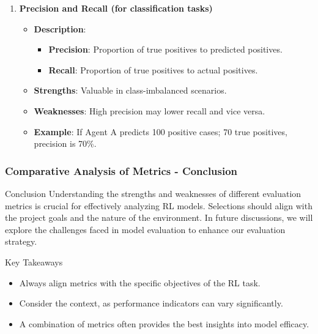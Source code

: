 \documentclass{beamer}
\begin{document}
\begin{frame}[fragile]
\begin{enumerate}[resume]
        \item \textbf{Precision and Recall (for classification tasks)}
            \begin{itemize}
                \item \textbf{Description}:
                    \begin{itemize}
                        \item \textbf{Precision}: Proportion of true positives to predicted positives.
                        \item \textbf{Recall}: Proportion of true positives to actual positives.
                    \end{itemize}
                \item \textbf{Strengths}: Valuable in class-imbalanced scenarios.
                \item \textbf{Weaknesses}: High precision may lower recall and vice versa.
                \item \textbf{Example}: If Agent A predicts 100 positive cases; 70 true positives, precision is 70\%.
            \end{itemize}
    \end{enumerate}
\end{frame}

\begin{frame}[fragile]
    \frametitle{Comparative Analysis of Metrics - Conclusion}
    \begin{block}{Conclusion}
        Understanding the strengths and weaknesses of different evaluation metrics is crucial for effectively analyzing RL models. Selections should align with the project goals and the nature of the environment. In future discussions, we will explore the challenges faced in model evaluation to enhance our evaluation strategy.
    \end{block}

    \begin{block}{Key Takeaways}
        \begin{itemize}
            \item Always align metrics with the specific objectives of the RL task.
            \item Consider the context, as performance indicators can vary significantly.
            \item A combination of metrics often provides the best insights into model efficacy.
        \end{itemize}
    \end{block}
\end{frame}
\end{document}
